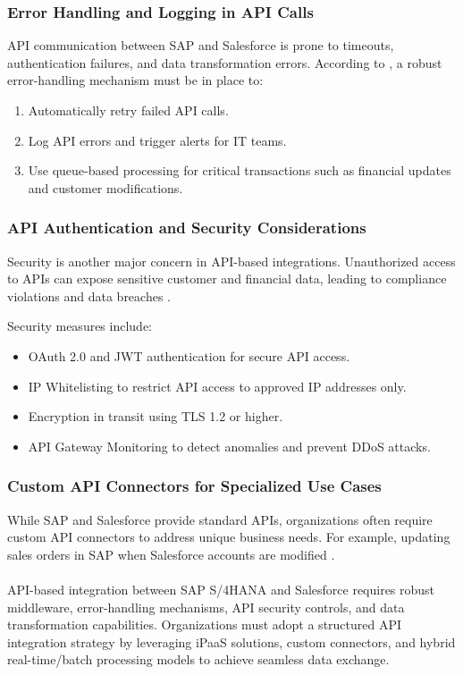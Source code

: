 \subsubsection{Error Handling and Logging in API Calls}
API communication between SAP and Salesforce is prone to timeouts, authentication failures, and data transformation errors. According to \cite{chinta2024}, a robust error-handling mechanism must be in place to:
\begin{enumerate}
    \item Automatically retry failed API calls.
    \item Log API errors and trigger alerts for IT teams.
    \item Use queue-based processing for critical transactions such as financial updates and customer modifications.
\end{enumerate}

\subsubsection{API Authentication and Security Considerations}
Security is another major concern in API-based integrations. Unauthorized access to APIs can expose sensitive customer and financial data, leading to compliance violations and data breaches \cite{chinta2024}.

Security measures include:
\begin{itemize}
    \item OAuth 2.0 and JWT authentication for secure API access.
    \item IP Whitelisting to restrict API access to approved IP addresses only.
    \item Encryption in transit using TLS 1.2 or higher.
    \item API Gateway Monitoring to detect anomalies and prevent DDoS attacks.
\end{itemize}

\subsubsection{Custom API Connectors for Specialized Use Cases}
While SAP and Salesforce provide standard APIs, organizations often require custom API connectors to address unique business needs. For example, updating sales orders in SAP when Salesforce accounts are modified \cite{aljawarneh2018}.

\paragraph{}
API-based integration between SAP S/4HANA and Salesforce requires robust middleware, error-handling mechanisms, API security controls, and data transformation capabilities. Organizations must adopt a structured API integration strategy by leveraging iPaaS solutions, custom connectors, and hybrid real-time/batch processing models to achieve seamless data exchange.

